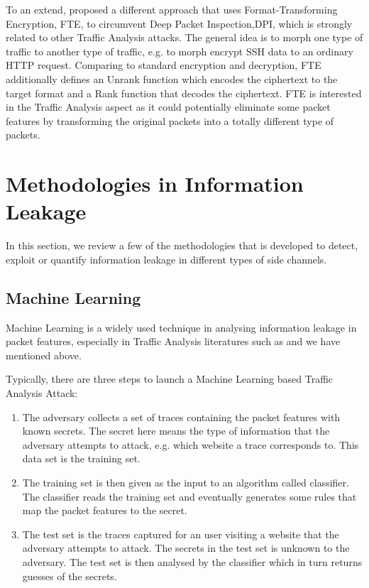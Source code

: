 To an extend, \cite{FTE} proposed a different approach that uses Format-Transforming Encryption, FTE, to circumvent Deep Packet Inspection,DPI, which is strongly related to other Traffic Analysis attacks. The general idea is to morph one type of traffic to another type of traffic, e.g. to morph encrypt SSH data to an ordinary HTTP request. Comparing to standard encryption and decryption, FTE additionally defines an Unrank function which encodes the ciphertext to the target format and a Rank function that decodes the ciphertext. FTE is interested in the Traffic Analysis aspect as it could potentially eliminate some packet features by transforming the original packets into a totally different type of packets.

\section{Methodologies in Information Leakage }

In this section, we review a few of the methodologies that is developed to detect, exploit or quantify information leakage in different types of side channels. 

\subsection{Machine Learning}
Machine Learning is a widely used technique in analysing information leakage in packet features, especially in Traffic Analysis literatures such as \cite{Peekaboo} \cite{TrafficMorphing} \cite{WebsiteFingerprint} \cite{HClassifier} \cite{PClassifier} and \cite{HTTPOS} we have mentioned above. 

Typically, there are three steps to launch a Machine Learning based Traffic Analysis Attack:

\begin{enumerate}
	\item The adversary collects a set of traces containing the packet features with known secrets. The secret here means the type of information that the adversary attempts to attack, e.g. which website a trace corresponds to. This data set is the training set.
	\item The training set is then given as the input to an algorithm called classifier. The classifier reads the training set and eventually generates some rules that map the packet features to the secret. 
	\item The test set is the traces captured for an user visiting a website that the adversary attempts to attack. The secrets in the test set is unknown to the adversary. The test set is then analysed by the classifier which in turn returns guesses of the secrets.
\end{enumerate}

